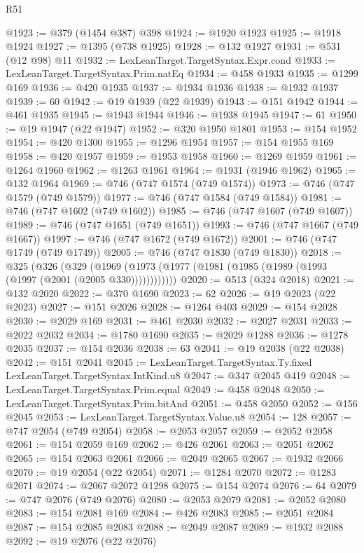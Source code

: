 \begin{lexlean}{R51}
\begin{coremodule}
@1923 := @379 (@1454 @387) @398
@1924 := @1920 @1923
@1925 := @1918 @1924
@1927 := @1395 (@738 @1925)
@1928 := @132 @1927
@1931 := @531 (@12 @98) @11
@1932 := LexLeanTarget.TargetSyntax.Expr.cond
@1933 := LexLeanTarget.TargetSyntax.Prim.natEq
@1934 := @458 @1933
@1935 := @1299 @169
@1936 := @420 @1935
@1937 := @1934 @1936
@1938 := @1932 @1937
@1939 := 60
@1942 := @19 @1939 (@22 @1939)
@1943 := @151 @1942
@1944 := @461 @1935
@1945 := @1943 @1944
@1946 := @1938 @1945
@1947 := 61
@1950 := @19 @1947 (@22 @1947)
@1952 := @320 @1950 @1801
@1953 := @154 @1952
@1954 := @420 @1300
@1955 := @1296 @1954
@1957 := @154 @1955 @169
@1958 := @420 @1957
@1959 := @1953 @1958
@1960 := @1269 @1959
@1961 := @1264 @1960
@1962 := @1263 @1961
@1964 := @1931 (@1946 @1962)
@1965 := @132 @1964
@1969 := @746 (@747 @1574 (@749 @1574))
@1973 := @746 (@747 @1579 (@749 @1579))
@1977 := @746 (@747 @1584 (@749 @1584))
@1981 := @746 (@747 @1602 (@749 @1602))
@1985 := @746 (@747 @1607 (@749 @1607))
@1989 := @746 (@747 @1651 (@749 @1651))
@1993 := @746 (@747 @1667 (@749 @1667))
@1997 := @746 (@747 @1672 (@749 @1672))
@2001 := @746 (@747 @1749 (@749 @1749))
@2005 := @746 (@747 @1830 (@749 @1830))
@2018 := @325
    (@326
      (@329 (@1969 (@1973 (@1977 (@1981 (@1985 (@1989 (@1993 (@1997 (@2001 (@2005 @330))))))))))))
@2020 := @513 (@324 @2018)
@2021 := @132 @2020
@2022 := @370 @1690
@2023 := 62
@2026 := @19 @2023 (@22 @2023)
@2027 := @151 @2026
@2028 := @1264 @403
@2029 := @154 @2028
@2030 := @2029 @169
@2031 := @461 @2030
@2032 := @2027 @2031
@2033 := @2022 @2032
@2034 := @1780 @1690
@2035 := @2029 @1288
@2036 := @1278 @2035
@2037 := @154 @2036
@2038 := 63
@2041 := @19 @2038 (@22 @2038)
@2042 := @151 @2041
@2045 := LexLeanTarget.TargetSyntax.Ty.fixed LexLeanTarget.TargetSyntax.IntKind.u8
@2047 := @347 @2045 @419
@2048 := LexLeanTarget.TargetSyntax.Prim.equal
@2049 := @458 @2048
@2050 := LexLeanTarget.TargetSyntax.Prim.bitAnd
@2051 := @458 @2050
@2052 := @156 @2045
@2053 := LexLeanTarget.TargetSyntax.Value.u8
@2054 := 128
@2057 := @747 @2054 (@749 @2054)
@2058 := @2053 @2057
@2059 := @2052 @2058
@2061 := @154 @2059 @169
@2062 := @426 @2061
@2063 := @2051 @2062
@2065 := @154 @2063 @2061
@2066 := @2049 @2065
@2067 := @1932 @2066
@2070 := @19 @2054 (@22 @2054)
@2071 := @1284 @2070
@2072 := @1283 @2071
@2074 := @2067 @2072 @1298
@2075 := @154 @2074
@2076 := 64
@2079 := @747 @2076 (@749 @2076)
@2080 := @2053 @2079
@2081 := @2052 @2080
@2083 := @154 @2081 @169
@2084 := @426 @2083
@2085 := @2051 @2084
@2087 := @154 @2085 @2083
@2088 := @2049 @2087
@2089 := @1932 @2088
@2092 := @19 @2076 (@22 @2076)

\end{coremodule}
\end{lexlean}
